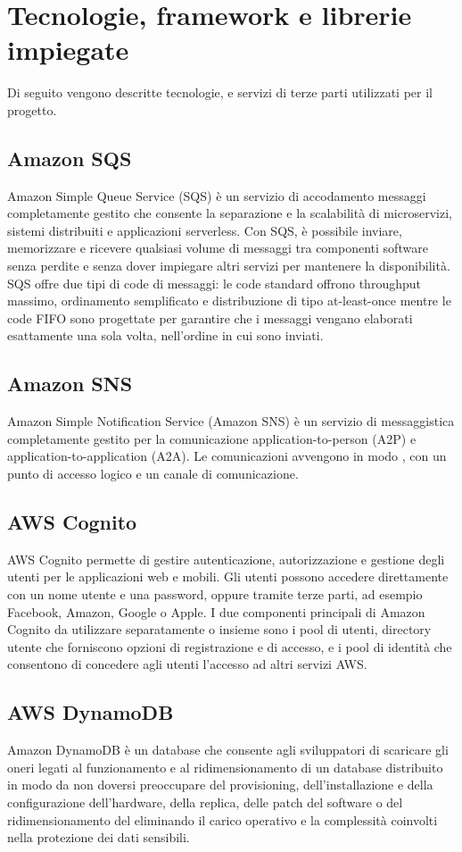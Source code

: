 \section{Tecnologie, framework e librerie impiegate}\label{Tecnologie}
Di seguito vengono descritte tecnologie,  e servizi di terze parti utilizzati per il progetto.

\subsection{Amazon SQS}
Amazon Simple Queue Service (SQS) è un servizio di accodamento messaggi completamente gestito che consente la separazione e la scalabilità di microservizi, sistemi distribuiti e applicazioni serverless. Con SQS, è possibile inviare, memorizzare e ricevere qualsiasi volume di messaggi tra componenti software senza perdite e senza dover impiegare altri servizi per mantenere la disponibilità.
SQS offre due tipi di code di messaggi: le code standard offrono throughput massimo, ordinamento semplificato e distribuzione di tipo at-least-once mentre le code FIFO sono progettate per garantire che i messaggi vengano elaborati esattamente una sola volta, nell'ordine in cui sono inviati.

\subsection{Amazon SNS}
Amazon Simple Notification Service (Amazon SNS) è un servizio di messaggistica completamente gestito per la comunicazione application-to-person (A2P) e application-to-application (A2A).
Le comunicazioni avvengono in modo , con un punto di accesso logico e un canale di comunicazione.

\subsection{AWS Cognito}
AWS Cognito permette di gestire autenticazione, autorizzazione e gestione degli utenti per le applicazioni web e mobili. Gli utenti possono accedere direttamente con un nome utente e una password, oppure tramite terze parti, ad esempio Facebook, Amazon, Google o Apple.
I due componenti principali di Amazon Cognito da utilizzare separatamente o insieme sono i pool di utenti, directory utente che forniscono opzioni di registrazione e di accesso, e i pool di identità che consentono di concedere agli utenti l'accesso ad altri servizi AWS.

\subsection{AWS DynamoDB}
Amazon DynamoDB è un database  che consente agli sviluppatori di scaricare gli oneri legati al funzionamento e al ridimensionamento di un database distribuito in modo da non doversi preoccupare del provisioning, dell'installazione e della configurazione dell'hardware, della replica, delle patch del software o del ridimensionamento del  eliminando il carico operativo e la complessità coinvolti nella protezione dei dati sensibili.


